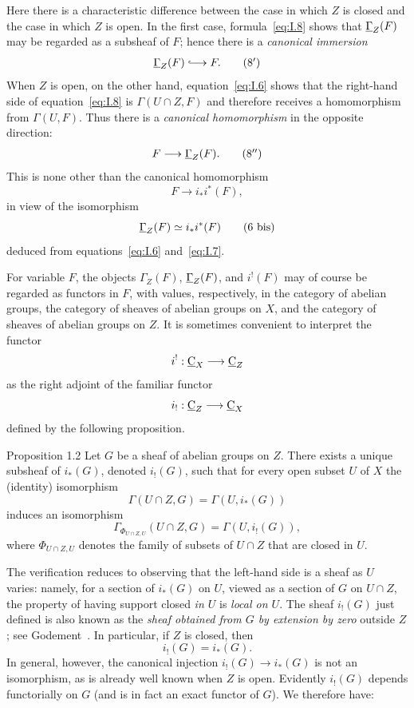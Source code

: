 Here there is a characteristic difference between the case in which
$Z$ is closed and the case in which $Z$ is open.  In the first case,
formula~\eqref{eq:I.8} shows that $\mathop{\underline{\Gamma}}\nolimits_Z(F)$ may be regarded as a
subsheaf of $F$; hence there is a \emph{canonical immersion}
\begin{equation}
  \uGamma_Z(F)\lhook\joinrel\longrightarrow F.
  \tag{$8'$}\label{eq:I.8'}
\end{equation}
When $Z$ is open, on the other hand, equation~\eqref{eq:I.6} shows that
the right-hand side of equation~\eqref{eq:I.8} is
$\Gamma(U\cap Z,F)$ and therefore receives a homomorphism from
$\Gamma(U,F)$.  Thus there is a \emph{canonical homomorphism} in the
opposite direction:
\begin{equation}
  F\longrightarrow\mathop{\underline{\Gamma}}\nolimits_Z(F).
  \tag{$8''$}\label{eq:I.8''}
\end{equation}
This is none other than the canonical homomorphism
\[
  F\longrightarrow i_*i^*(F),
\]
in view of the isomorphism
\begin{equation}
  \mathop{\underline{\Gamma}}\nolimits_Z(F)\simeq i_*i^*(F)
  \tag{6 bis}\label{eq:I.6bis}
\end{equation}
deduced from equations~\eqref{eq:I.6} and~\eqref{eq:I.7}.

For variable $F$, the objects $\Gamma_Z(F)$, $\mathop{\underline{\Gamma}}\nolimits_Z(F)$, and
$i^!(F)$ may of course be regarded as functors in $F$, with values,
respectively, in the category of abelian groups, the category of sheaves
of abelian groups on $X$, and the category of sheaves of abelian groups
on $Z$.  It is sometimes convenient to interpret the functor
\[
  i^!: \underline{\mathrm C}_X\longrightarrow\underline{\mathrm C}_Z
\]
as the right adjoint of the familiar functor
\[
  i_!: \underline{\mathrm C}_Z\longrightarrow\underline{\mathrm C}_X
\]
defined by the following proposition.

\begin{sgastatement}{Proposition 1.2}
Let $G$ be a sheaf of abelian groups on $Z$.  There exists a unique
subsheaf of $i_*(G)$, denoted $i_!(G)$, such that for every open subset
$U$ of $X$ the (identity) isomorphism
\[
  \Gamma(U\cap Z,G)=\Gamma(U,i_*(G))
\]
induces an isomorphism
\[
  \Gamma_{\Phi_{U\cap Z,U}}(U\cap Z,G)=\Gamma(U,i_!(G)),
\]
where $\Phi_{U\cap Z,U}$ denotes the family of subsets of $U\cap Z$
that are closed in $U$.
\end{sgastatement}

The verification reduces to observing that the left-hand side is a
sheaf as $U$ varies: namely, for a section of $i_*(G)$ on $U$, viewed
as a section of $G$ on $U\cap Z$, the property of having support closed
\emph{in $U$} is \emph{local on $U$}.  The sheaf $i_!(G)$ just defined
is also known as the \emph{sheaf obtained from $G$ by extension by zero}
outside $Z$; see Godement~\cite{Godement}.  In particular, if $Z$ is
closed, then
\begin{equation}
  i_!(G)=i_*(G).
  \tag{9}\label{eq:I.9}
\end{equation}
In general, however, the canonical injection
$i_!(G)\to i_*(G)$ is not an isomorphism, as is already well known when
$Z$ is open.  Evidently $i_!(G)$ depends functorially on $G$ (and is in
fact an exact functor of $G$).  We therefore have:

